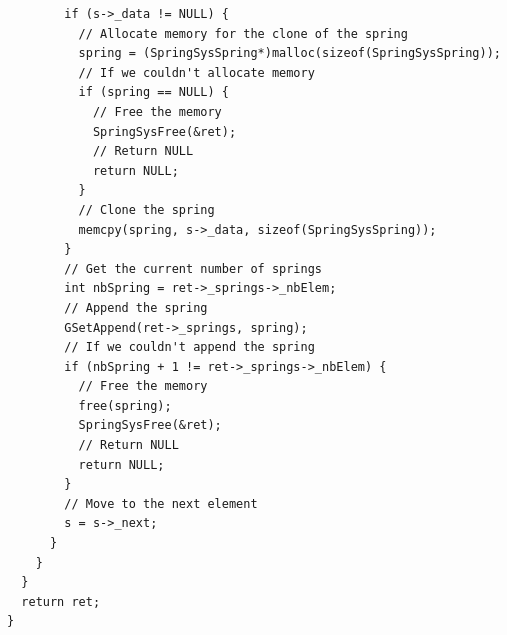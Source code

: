 \documentclass[12pt, a4paper]{article}
\begin{document}
\begin{scriptsize}
\begin{ttfamily}
\begin{lstlisting}
        if (s->_data != NULL) {
          // Allocate memory for the clone of the spring
          spring = (SpringSysSpring*)malloc(sizeof(SpringSysSpring));
          // If we couldn't allocate memory
          if (spring == NULL) {
            // Free the memory
            SpringSysFree(&ret);
            // Return NULL
            return NULL;
          }
          // Clone the spring
          memcpy(spring, s->_data, sizeof(SpringSysSpring));
        }
        // Get the current number of springs
        int nbSpring = ret->_springs->_nbElem;
        // Append the spring
        GSetAppend(ret->_springs, spring);
        // If we couldn't append the spring
        if (nbSpring + 1 != ret->_springs->_nbElem) {
          // Free the memory
          free(spring);
          SpringSysFree(&ret);
          // Return NULL
          return NULL;
        }
        // Move to the next element
        s = s->_next;
      }
    }
  }
  return ret;
}


\end{lstlisting}
\end{ttfamily}
\end{scriptsize}
\end{document}
